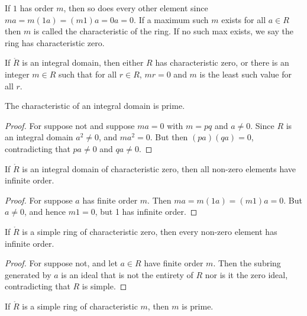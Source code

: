             If $1$ has order $m$, then so does every other element since
            $ma=m(1a)=(m1)a=0a=0$. If a maximum such $m$ exists for all
            $a\in{R}$ then $m$ is called the characteristic of the ring.
            If no such max exists, we say the ring has characteristic zero.
            \begin{theorem}
                If $\ring{R}$ is an integral domain, then either $R$ has
                characteristic zero, or there is an integer $m\in{R}$ such
                that for all $r\in{R}$, $mr=0$ and $m$ is the least such
                value for all $r$.
            \end{theorem}
            \begin{theorem}
                The characteristic of an integral domain is prime.
            \end{theorem}
            \begin{proof}
                For suppose not and suppose $ma=0$ with $m=pq$ and
                $a\ne{0}$. Since $R$ is an integral domain $a^{2}\ne{0}$,
                and $ma^{2}={0}$. But then $(pa)(qa)=0$, contradicting that
                $pa\ne{0}$ and $qa\ne{0}$.
            \end{proof}
            \begin{theorem}
                If $\ring{R}$ is an integral domain of characteristic zero,
                then all non-zero elements have infinite order.
            \end{theorem}
            \begin{proof}
                For suppose $a$ has finite order $m$. Then
                $ma=m(1a)=(m1)a=0$. But $a\ne{0}$, and hence $m1=0$, but
                1 has infinite order.
            \end{proof}
            \begin{theorem}
                If $\ring{R}$ is a simple ring of characteristic zero, then
                every non-zero element has infinite order.
            \end{theorem}
            \begin{proof}
                For suppose not, and let $a\in{R}$ have finite order $m$.
                Then the subring generated by $a$ is an ideal that is not
                the entirety of $R$ nor is it the zero ideal, contradicting
                that $R$ is simple.
            \end{proof}
            \begin{theorem}
                If $\ring{R}$ is a simple ring of characteristic $m$, then
                $m$ is prime.
            \end{theorem}
